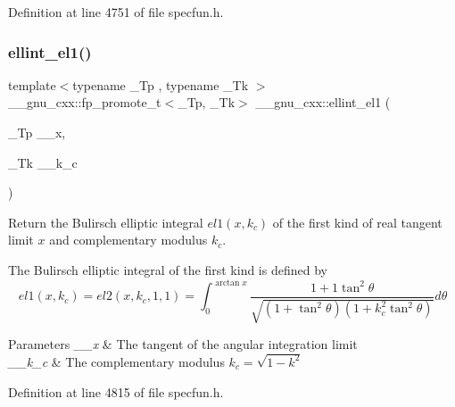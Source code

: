 Definition at line 4751 of file specfun.\+h.

\mbox{\label{group__gnu__math__spec__func_ga510b1e51e7d3bc937ed1b4c2f57492e4}} 
\subsubsection{\texorpdfstring{ellint\+\_\+el1()}{ellint\_el1()}}
{\footnotesize\ttfamily template$<$typename \+\_\+\+Tp , typename \+\_\+\+Tk $>$ \\
\+\_\+\+\_\+gnu\+\_\+cxx\+::fp\+\_\+promote\+\_\+t$<$\+\_\+\+Tp, \+\_\+\+Tk$>$ \+\_\+\+\_\+gnu\+\_\+cxx\+::ellint\+\_\+el1 (\begin{DoxyParamCaption}\item[{\+\_\+\+Tp}]{\+\_\+\+\_\+x,  }\item[{\+\_\+\+Tk}]{\+\_\+\+\_\+k\+\_\+c }\end{DoxyParamCaption})\hspace{0.3cm}{\ttfamily [inline]}}

Return the Bulirsch elliptic integral $ el1(x,k_c) $ of the first kind of real tangent limit $ x $ and complementary modulus $ k_c $.

The Bulirsch elliptic integral of the first kind is defined by \[ el1(x,k_c) = el2(x,k_c,1,1) = \int_0^{\arctan x} \frac{1+1\tan^2\theta} {\sqrt{(1+\tan^2\theta)(1+k_c^2\tan^2\theta)}}d\theta \]


\begin{DoxyParams}{Parameters}
{\em \+\_\+\+\_\+x} & The tangent of the angular integration limit \\
\hline
{\em \+\_\+\+\_\+k\+\_\+c} & The complementary modulus $ k_c = \sqrt{1 - k^2} $ \\
\hline
\end{DoxyParams}


Definition at line 4815 of file specfun.\+h.

\mbox{\label{group__gnu__math__spec__func_ga8d8342bb4f42c7fe09b5589c54d4e713}} 
